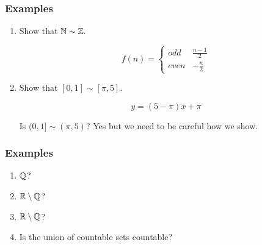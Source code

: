 \documentclass{report}
\begin{document}
\subsubsection{Examples}
\begin{enumerate}
  \item Show that $\NN \sim \ZZ.$
    \begin{myproof}
        
\[ 
 f(n) = 
  \begin{cases} 
  odd & \frac{n-1}{2} \\
  even & -\frac{n}{2}
   \end{cases}
\]
    \end{myproof}

  \item Show that $[0,1] \sim [\pi,5]$.
    \begin{myproof}
        $$y = (5- \pi)x + \pi$$
    \end{myproof}

    Is $(0,1] \sim (\pi,5)?$ Yes but we need to be careful how we show.
\end{enumerate}




\subsubsection{Examples}

\begin{enumerate}
  \item $\QQ$?
  \item $\RR \setminus \QQ$?
  \item $\RR \setminus \QQ$?
  \item Is the union of countable sets countable?
\end{enumerate}

\pagebreak
\end{document}
